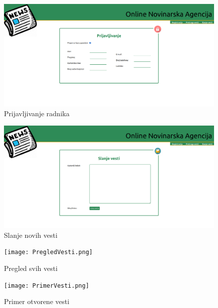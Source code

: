 \documentclass{article}
\begin{document}
\begin{figure}[htbp!]
    \centering
    \includegraphics[scale=0.20]{PrijavljivanjeRadnika.png}
    \caption{Prijavljivanje radnika}
    \label{slk:dtp}
\end{figure}

\begin{figure}[htbp!]
    \centering
    \includegraphics[scale=0.20]{SlanjeVesti.png}
    \caption{Slanje novih vesti}
    \label{slk:dtp}
\end{figure}

\begin{figure}[htbp!]
    \centering
    \texttt{[image: PregledVesti.png]}
    \caption{Pregled svih vesti}
    \label{slk:dtp}
\end{figure}

\begin{figure}[htbp!]
    \centering
    \texttt{[image: PrimerVesti.png]}
    \caption{Primer otvorene vesti}
    \label{slk:dtp}
\end{figure}
\end{document}
